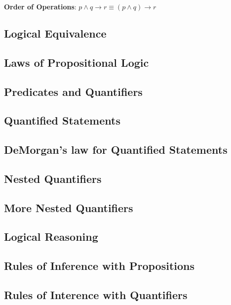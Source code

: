 \documentclass{article}
\begin{document}
\begin{center}
  \textbf{Order of Operations}: \(p \land q \rightarrow r \equiv (p \land q) \rightarrow r\)
\end{center}

\subsection{Logical Equivalence}



\subsection{Laws of Propositional Logic}



\subsection{Predicates and Quantifiers}



\subsection{Quantified Statements}



\subsection{DeMorgan's law for Quantified Statements}



\subsection{Nested Quantifiers}



\subsection{More Nested Quantifiers}



\subsection{Logical Reasoning}



\subsection{Rules of Inference with Propositions}



\subsection{Rules of Interence with Quantifiers}
\end{document}
